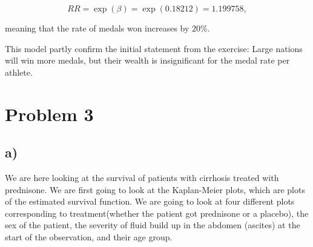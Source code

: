 \documentclass[a4paper,norsk, 10pt]{article}
\begin{document}
\begin{equation}
RR = \exp(\beta) = \exp(0.18212) = 1.199758,
\end{equation}

meaning that the rate of medals won increases by $20\%$.

This model partly confirm the initial statement from the exercise: Large nations will win more medals, but their wealth is insignificant for the medal rate per athlete.

\section{Problem 3}

\subsection{a)}
We are here looking at the survival of patients with cirrhosis treated with prednisone. We are first going to look at the Kaplan-Meier plots, which are plots of the estimated survival function. We are going to look at four different plots corresponding to treatment(whether the patient got prednisone or a placebo), the sex of the patient, the severity of fluid build up in the abdomen (ascites) at the start of the observation, and their age group.
\end{document}
